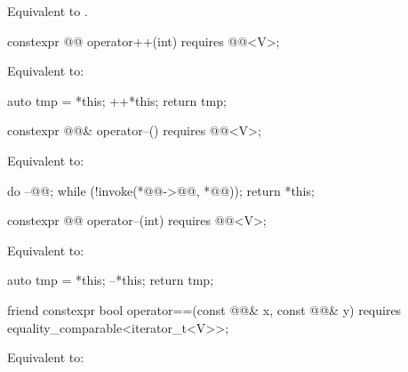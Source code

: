 \begin{itemdescr}
\pnum
\effects
Equivalent to .
\end{itemdescr}

%
\begin{itemdecl}
constexpr @@ operator++(int) requires @@<V>;
\end{itemdecl}

\begin{itemdescr}
\pnum
\effects
Equivalent to:
\begin{codeblock}
auto tmp = *this;
++*this;
return tmp;
\end{codeblock}
\end{itemdescr}

%
\begin{itemdecl}
constexpr @@& operator--() requires @@<V>;
\end{itemdecl}

\begin{itemdescr}
\pnum
\effects
Equivalent to:
\begin{codeblock}
do
  --@@;
while (!invoke(*@@->@@, *@@));
return *this;
\end{codeblock}
\end{itemdescr}

%
\begin{itemdecl}
constexpr @@ operator--(int) requires @@<V>;
\end{itemdecl}

\begin{itemdescr}
\pnum
\effects
Equivalent to:
\begin{codeblock}
auto tmp = *this;
--*this;
return tmp;
\end{codeblock}
\end{itemdescr}

%
\begin{itemdecl}
friend constexpr bool operator==(const @@& x, const @@& y)
  requires equality_comparable<iterator_t<V>>;
\end{itemdecl}

\begin{itemdescr}
\pnum
\effects
Equivalent to: 
\end{itemdescr}

